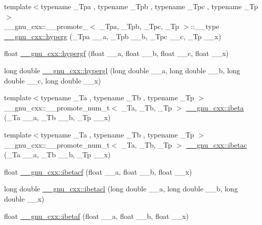 \begin{DoxyCompactItemize}
\item 
{\footnotesize template$<$typename \+\_\+\+Tpa , typename \+\_\+\+Tpb , typename \+\_\+\+Tpc , typename \+\_\+\+Tp $>$ }\\\+\_\+\+\_\+gnu\+\_\+cxx\+::\+\_\+\+\_\+promote\+\_$<$ \+\_\+\+Tpa, \+\_\+\+Tpb, \+\_\+\+Tpc, \+\_\+\+Tp $>$\+::\+\_\+\+\_\+type \hyperlink{group__gnu__math__spec__func_gaf52cf49736c63b0bb000be98b53c221f}{\+\_\+\+\_\+gnu\+\_\+cxx\+::hyperg} (\+\_\+\+Tpa \+\_\+\+\_\+a, \+\_\+\+Tpb \+\_\+\+\_\+b, \+\_\+\+Tpc \+\_\+\+\_\+c, \+\_\+\+Tp \+\_\+\+\_\+x)
\item 
float \hyperlink{group__gnu__math__spec__func_gac4c81e4ea9cef149fe40291ca10d7e15}{\+\_\+\+\_\+gnu\+\_\+cxx\+::hypergf} (float \+\_\+\+\_\+a, float \+\_\+\+\_\+b, float \+\_\+\+\_\+c, float \+\_\+\+\_\+x)
\item 
long double \hyperlink{group__gnu__math__spec__func_ga9961967087216e97f76283f29e1be152}{\+\_\+\+\_\+gnu\+\_\+cxx\+::hypergl} (long double \+\_\+\+\_\+a, long double \+\_\+\+\_\+b, long double \+\_\+\+\_\+c, long double \+\_\+\+\_\+x)
\item 
{\footnotesize template$<$typename \+\_\+\+Ta , typename \+\_\+\+Tb , typename \+\_\+\+Tp $>$ }\\\+\_\+\+\_\+gnu\+\_\+cxx\+::\+\_\+\+\_\+promote\+\_\+num\+\_\+t$<$ \+\_\+\+Ta, \+\_\+\+Tb, \+\_\+\+Tp $>$ \hyperlink{group__gnu__math__spec__func_ga99e687949634408cd1050cceedbdf962}{\+\_\+\+\_\+gnu\+\_\+cxx\+::ibeta} (\+\_\+\+Ta \+\_\+\+\_\+a, \+\_\+\+Tb \+\_\+\+\_\+b, \+\_\+\+Tp \+\_\+\+\_\+x)
\item 
{\footnotesize template$<$typename \+\_\+\+Ta , typename \+\_\+\+Tb , typename \+\_\+\+Tp $>$ }\\\+\_\+\+\_\+gnu\+\_\+cxx\+::\+\_\+\+\_\+promote\+\_\+num\+\_\+t$<$ \+\_\+\+Ta, \+\_\+\+Tb, \+\_\+\+Tp $>$ \hyperlink{group__gnu__math__spec__func_ga474e422dce07316da26bb2c2579b7968}{\+\_\+\+\_\+gnu\+\_\+cxx\+::ibetac} (\+\_\+\+Ta \+\_\+\+\_\+a, \+\_\+\+Tb \+\_\+\+\_\+b, \+\_\+\+Tp \+\_\+\+\_\+x)
\item 
float \hyperlink{group__gnu__math__spec__func_gabd7fa090deead18b167c26b8994b9f53}{\+\_\+\+\_\+gnu\+\_\+cxx\+::ibetacf} (float \+\_\+\+\_\+a, float \+\_\+\+\_\+b, float \+\_\+\+\_\+x)
\item 
long double \hyperlink{group__gnu__math__spec__func_ga48995d537b82e426362a4831ffa1be39}{\+\_\+\+\_\+gnu\+\_\+cxx\+::ibetacl} (long double \+\_\+\+\_\+a, long double \+\_\+\+\_\+b, long double \+\_\+\+\_\+x)
\item 
float \hyperlink{group__gnu__math__spec__func_ga97a5e3afdd990a2d3e199df6856bcf9f}{\+\_\+\+\_\+gnu\+\_\+cxx\+::ibetaf} (float \+\_\+\+\_\+a, float \+\_\+\+\_\+b, float \+\_\+\+\_\+x)

\end{DoxyCompactItemize}
